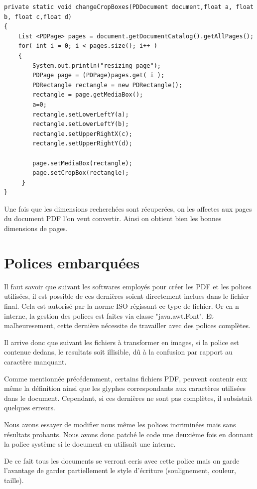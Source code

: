 

    \lstset{language=Java}
	\begin{lstlisting} 
private static void changeCropBoxes(PDDocument document,float a, float b, float c,float d)
{
	List <PDPage> pages = document.getDocumentCatalog().getAllPages();
	for( int i = 0; i < pages.size(); i++ )
	{
        System.out.println("resizing page");
        PDPage page = (PDPage)pages.get( i );
        PDRectangle rectangle = new PDRectangle();
        rectangle = page.getMediaBox();
        a=0;
        rectangle.setLowerLeftY(a);
        rectangle.setLowerLeftY(b);
        rectangle.setUpperRightX(c);
        rectangle.setUpperRightY(d);

        page.setMediaBox(rectangle);
        page.setCropBox(rectangle);
	 }
}
 \end{lstlisting}

        Une fois que les dimensions recherchées sont récuperées, on les affectes
    aux pages du document PDF l'on veut convertir. Ainsi on obtient bien les bonnes 
    dimensions de pages.



    \section{Polices embarquées}
        Il faut savoir que suivant les softwares employés pour créer les PDF et
    les polices utilisées, il est possible de ces dernières soient directement
    inclues dans le fichier final. Cela est autorisé par la norme ISO régissant 
    ce type de fichier. Or en n interne, la gestion des polices est faites via 
    classe "java.awt.Font". Et malheuresement, cette dernière nécessite de travailler
    avec des polices complètes.

        Il arrive donc que suivant les fichiers à transformer en images, si la police 
    est contenue dedans, le resultats soit illisible, dû à la confusion par rapport
    au caractère manquant.


        Comme mentionnée précédemment, certains fichiers PDF, peuvent contenir eux 
    même la définition ainsi que les glyphes correspondants aux caractères utilisées dans 
    le document. Cependant, si ces dernières ne sont pas complètes, il subsistait
    quelques erreurs.

        Nous avons essayer de modifier nous même les polices incriminées mais 
    sans résultats probants. Nous avons donc patché le code une deuxième fois 
    en donnant la police système si le document en utilisait une interne.

        De ce fait tous les documents se verront ecris avec cette police mais 
    on garde l'avantage de garder partiellement le style d'écriture 
    (soulignement, couleur, taille).







